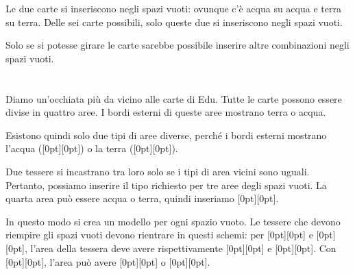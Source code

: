 {{{\centering%
\par}

Le due carte si inseriscono negli spazi vuoti: ovunque c’è acqua su acqua e terra su terra. Delle sei carte possibili, solo queste due si inseriscono negli spazi vuoti.

Solo se si potesse girare le carte sarebbe possibile inserire altre combinazioni negli spazi vuoti.



\section*{\BrochureItsInformatics}
Diamo un’occhiata più da vicino alle carte di Edu. Tutte le carte possono essere divise in quattro aree. I bordi esterni di queste aree mostrano terra o acqua.

{\centering%
\par}

Esistono quindi solo due tipi di aree diverse, perché i bordi esterni mostrano l’acqua (\raisebox{-0.5ex}[0pt][0pt]{}) o la terra (\raisebox{-0.5ex}[0pt][0pt]{}).

{\centering%
\par}

Due tessere si incastrano tra loro solo se i tipi di area vicini sono uguali. Pertanto, possiamo inserire il tipo richiesto per tre aree degli spazi vuoti. La quarta area può essere acqua o terra, quindi inseriamo \raisebox{-0.5ex}[0pt][0pt]{}.

In questo modo si crea un modello per ogni spazio vuoto. Le tessere che devono riempire gli spazi vuoti devono rientrare in questi schemi: per \raisebox{-0.5ex}[0pt][0pt]{} e \raisebox{-0.5ex}[0pt][0pt]{}, l’area della tessera deve avere rispettivamente \raisebox{-0.5ex}[0pt][0pt]{} e \raisebox{-0.5ex}[0pt][0pt]{}. Con \raisebox{-0.5ex}[0pt][0pt]{}, l’area può avere \raisebox{-0.5ex}[0pt][0pt]{} o \raisebox{-0.5ex}[0pt][0pt]{}.

}}
